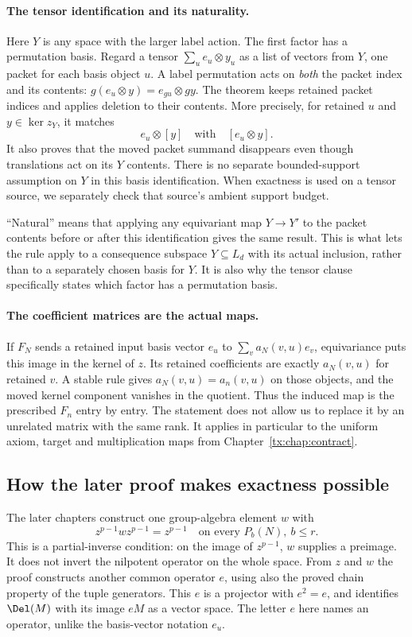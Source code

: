 \paragraph{The tensor identification and its naturality.}
Here $Y$ is any space with the larger label action. The first
factor has a permutation basis. Regard a tensor
$\sum_u e_u\otimes y_u$ as a list of vectors from $Y$, one
packet for each basis object $u$. A label permutation acts on
\emph{both} the packet index and its contents:
$g(e_u\otimes y)=e_{gu}\otimes gy$.
The theorem keeps retained packet indices and applies deletion
to their contents. More precisely, for retained $u$ and
$y\in\ker z_Y$, it matches
\[
                         e_u\otimes[y]\quad\text{with}\quad[e_u\otimes y].
\]
It also proves that the moved packet summand disappears even
though translations act on its $Y$ contents. There is no separate
bounded-support assumption on $Y$ in this basis identification.
When exactness is used on a tensor source, we separately check
that source's ambient support budget.

``Natural'' means that applying any equivariant map $Y\to Y'$
to the packet contents before or after this identification gives
the same result. This is what lets the rule apply to a consequence
subspace $Y\subseteq L_d$ with its actual inclusion, rather than
to a separately chosen basis for $Y$. It is also why the tensor
clause specifically states which factor has a permutation basis.

\paragraph{The coefficient matrices are the actual maps.}
If $F_N$ sends a retained input basis vector $e_u$ to
$\sum_v a_N(v,u)e_v$, equivariance puts this image in the kernel
of $z$. Its retained coefficients are exactly $a_N(v,u)$ for
retained $v$. A stable rule gives $a_N(v,u)=a_n(v,u)$ on those
objects, and the moved kernel component vanishes in the quotient.
Thus the induced map is the prescribed $F_n$ entry by entry.
The statement does not allow us to replace it by an unrelated
matrix with the same rank. It applies in particular to the
uniform axiom, target and multiplication maps from Chapter~\ref{tx:chap:contract}.

\subsection*{How the later proof makes exactness possible}
The later chapters construct one group-algebra element $w$ with
\[
             z^{p-1}wz^{p-1}=z^{p-1}
                           \quad\text{on every }P_b(N),\ b\le r.
\]
This is a partial-inverse condition: on the image of $z^{p-1}$,
$w$ supplies a preimage. It does not invert the nilpotent operator
on the whole space. From $z$ and $w$ the proof constructs another
common operator $e$, using also the proved chain property of the
tuple generators. This $e$ is a projector with $e^2=e$, and identifies
$\Del(M)$ with its image $eM$ as a vector space. The letter $e$
here names an operator, unlike the basis-vector notation $e_u$.

